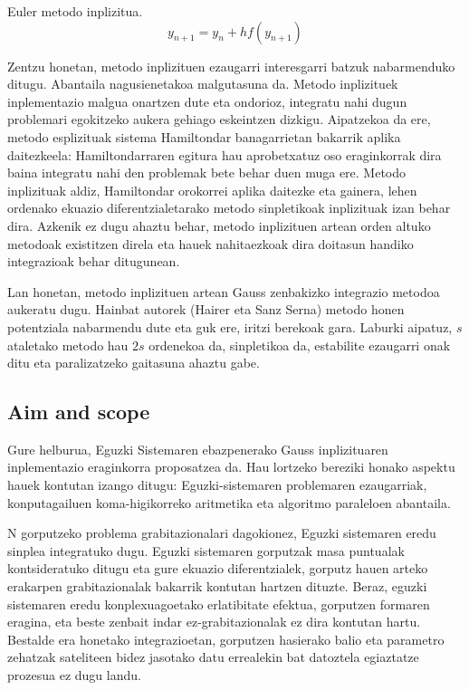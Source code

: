 Euler metodo inplizitua.
\begin{equation}
y_{n+1}=y_n+hf(y_{n+1})
\end{equation}

Zentzu honetan, metodo inplizituen ezaugarri interesgarri batzuk nabarmenduko ditugu. Abantaila nagusienetakoa malgutasuna da.  Metodo inplizituek inplementazio malgua onartzen dute eta ondorioz, integratu nahi dugun problemari egokitzeko aukera gehiago eskeintzen dizkigu. Aipatzekoa da ere, metodo esplizituak sistema Hamiltondar banagarrietan bakarrik aplika daitezkeela: Hamiltondarraren egitura hau aprobetxatuz oso eraginkorrak dira baina integratu nahi den problemak bete behar duen muga ere. Metodo inplizituak aldiz, Hamiltondar orokorrei aplika daitezke eta gainera, lehen ordenako ekuazio diferentzialetarako  metodo sinpletikoak inplizituak izan behar dira.  Azkenik ez dugu ahaztu behar, metodo inplizituen artean orden altuko metodoak existitzen direla  eta hauek nahitaezkoak dira doitasun handiko integrazioak behar ditugunean.     

Lan honetan, metodo inplizituen artean Gauss zenbakizko integrazio metodoa aukeratu dugu. Hainbat autorek (Hairer eta Sanz Serna) metodo honen potentziala nabarmendu dute eta guk ere, iritzi berekoak gara. Laburki aipatuz, $s$ ataletako metodo hau $2s$ ordenekoa da, sinpletikoa da, estabilite ezaugarri onak ditu eta paralizatzeko gaitasuna ahaztu gabe.      

\subsection{Aim and scope}

Gure helburua, Eguzki Sistemaren ebazpenerako Gauss inplizituaren inplementazio eraginkorra proposatzea da. Hau lortzeko  bereziki honako aspektu hauek kontutan izango ditugu: Eguzki-sistemaren problemaren ezaugarriak, konputagailuen koma-higikorreko aritmetika eta algoritmo paraleloen abantaila.  

N gorputzeko problema grabitazionalari dagokionez, Eguzki sistemaren eredu sinplea integratuko dugu. Eguzki sistemaren gorputzak masa puntualak kontsideratuko ditugu eta gure ekuazio diferentzialek, gorputz hauen arteko erakarpen grabitazionalak bakarrik kontutan hartzen dituzte. Beraz, eguzki sistemaren eredu konplexuagoetako erlatibitate efektua, gorputzen formaren eragina, eta beste zenbait indar ez-grabitazionalak ez dira kontutan hartu.
Bestalde era honetako integrazioetan, gorputzen hasierako balio eta parametro zehatzak sateliteen bidez jasotako datu errealekin bat datoztela egiaztatze prozesua ez dugu landu.

